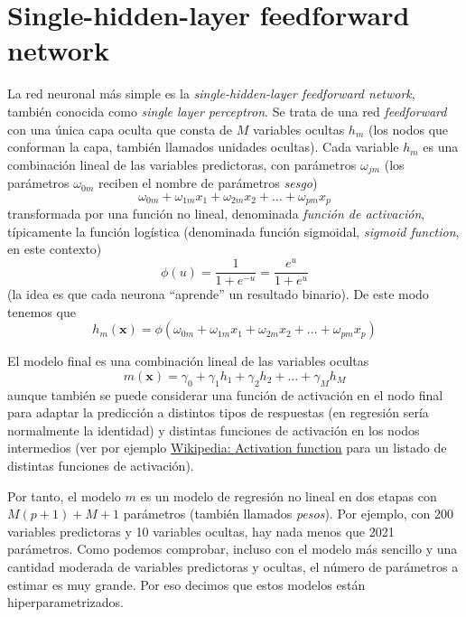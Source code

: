 \documentclass[
]{book}
\theoremstyle{break}
\theoremstyle{nonumberplain}
\begin{document}
\hypertarget{single-hidden-layer-feedforward-network}{%
\section{Single-hidden-layer feedforward network}\label{single-hidden-layer-feedforward-network}}

La red neuronal más simple es la \emph{single-hidden-layer feedforward network}, también conocida como \emph{single layer perceptron}.
Se trata de una red \emph{feedforward} con una única capa oculta que consta de \(M\) variables ocultas \(h_m\) (los nodos que conforman la capa, también llamados unidades ocultas).
Cada variable \(h_m\) es una combinación lineal de las variables predictoras, con parámetros \(\omega_{jm}\) (los parámetros \(\omega_{0m}\) reciben el nombre de parámetros \emph{sesgo})
\[\omega_{0m} + \omega_{1m} x_1 + \omega_{2m} x_2 + \ldots + \omega_{pm} x_p\]
transformada por una función no lineal, denominada \emph{función de activación}, típicamente la función logística (denominada función sigmoidal, \emph{sigmoid function}, en este contexto)
\[\phi(u) = \frac{1}{1 + e^{-u}} = \frac{e^u}{1 + e^u}\]
(la idea es que cada neurona ``aprende'' un resultado binario).
De este modo tenemos que
\[h_{m}(\mathbf{x}) = \phi\left( \omega_{0m} + \omega_{1m} x_1 + \omega_{2m} x_2 + \ldots + \omega_{pm} x_p \right)\]

El modelo final es una combinación lineal de las variables ocultas
\[m(\mathbf{x}) = \gamma_0 + \gamma_1 h_1 + \gamma_2 h_2 + \ldots + \gamma_M h_M\]
aunque también se puede considerar una función de activación en el nodo final para adaptar la predicción a distintos tipos de respuestas (en regresión sería normalmente la identidad) y distintas funciones de activación en los nodos intermedios (ver por ejemplo \href{https://en.wikipedia.org/wiki/Activation_function}{Wikipedia: Activation function} para un listado de distintas funciones de activación).

Por tanto, el modelo \(m\) es un modelo de regresión no lineal en dos etapas con \(M(p + 1) + M + 1\) parámetros (también llamados \emph{pesos}).
Por ejemplo, con 200 variables predictoras y 10 variables ocultas, hay nada menos que 2021 parámetros.
Como podemos comprobar, incluso con el modelo más sencillo y una cantidad moderada de variables predictoras y ocultas, el número de parámetros a estimar es muy grande.
Por eso decimos que estos modelos están hiperparametrizados.
\end{document}
